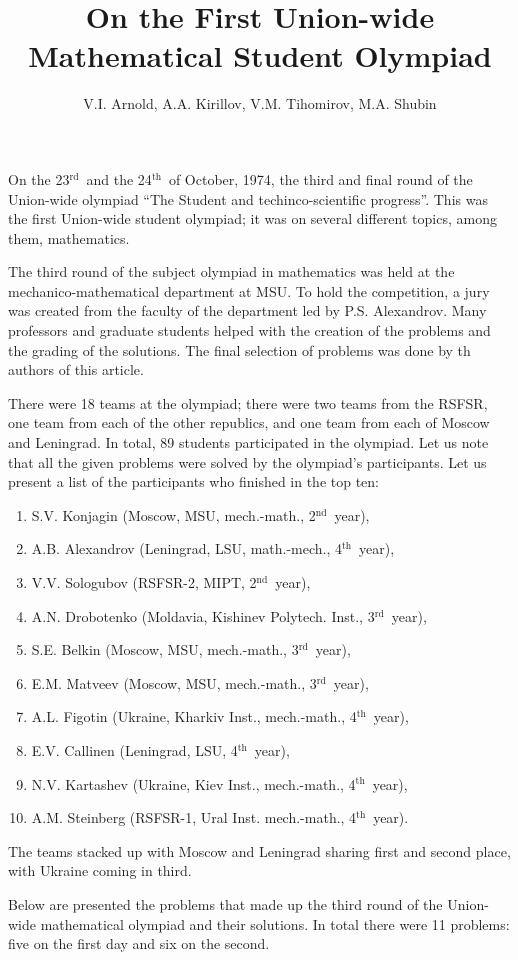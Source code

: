 \documentclass[12pt]{amsart}
\title{On the First Union-wide Mathematical Student Olympiad}
\author{V.I. Arnold, A.A. Kirillov, V.M. Tihomirov, M.A. Shubin}
\newcommand{\nd}{$^\text{nd}$~}
\newcommand{\rd}{$^\text{rd}$~}
\renewcommand{\th}{$^\text{th}$~}
\begin{document}
\maketitle
On the 23\rd and the 24\th of October, 1974, the third and
final round of the Union-wide olympiad ``The Student and techinco-scientific
progress''.
This was the first Union-wide student olympiad; it was on several different
topics, among them, mathematics.

The third round of the subject olympiad in mathematics was held at the
mechanico-mathematical department at MSU.
To hold the competition, a jury was created from the faculty of the department
led by P.S. Alexandrov.
Many professors and graduate students helped with the creation of the problems
and the grading of the solutions.
The final selection of problems was done by th authors of this article.

There were 18 teams at the olympiad; there were two teams from the RSFSR, one
team from each of the other republics, and one team from each of Moscow and
Leningrad.
In total, 89 students participated in the olympiad.
Let us note that all the given problems were solved by the olympiad's
participants.
Let us present a list of the participants who finished in the top ten:
\begin{enumerate}
\item
S.V. Konjagin (Moscow, MSU, mech.-math., 2\nd year),
\item
A.B. Alexandrov (Leningrad, LSU, math.-mech., 4\th year),
\item
V.V. Sologubov (RSFSR-2, MIPT, 2\nd year),
\item
A.N. Drobotenko (Moldavia, Kishinev Polytech. Inst., 3\rd year),
\item
S.E. Belkin (Moscow, MSU, mech.-math., 3\rd year),
\item
E.M. Matveev (Moscow, MSU, mech.-math., 3\rd year),
\item
A.L. Figotin (Ukraine, Kharkiv Inst., mech.-math., 4\th year),
\item
E.V. Callinen (Leningrad, LSU, 4\th year),
\item
N.V. Kartashev (Ukraine, Kiev Inst., mech.-math., 4\th year),
\item
A.M. Steinberg (RSFSR-1, Ural Inst. mech.-math., 4\th year).
\end{enumerate}

The teams stacked up with Moscow and Leningrad sharing first and second place,
with Ukraine coming in third.

Below are presented the problems that made up the third round of the Union-wide
mathematical olympiad and their solutions.
In total there were 11 problems: five on the first day and six on the second.\\
\hspace{0ex}\\
\end{document}
